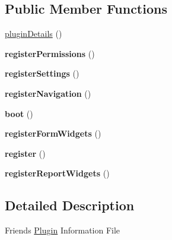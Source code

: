\subsection*{Public Member Functions}
\begin{DoxyCompactItemize}
\item 
\hyperlink{classDMA_1_1Friends_1_1Plugin_abcae4983c18bdb7b266c6aaa7a081d68}{plugin\-Details} ()
\item 
\hypertarget{classDMA_1_1Friends_1_1Plugin_a1f5f007ec6f0f3f16516cf1a2e19d296}{{\bfseries register\-Permissions} ()}\label{classDMA_1_1Friends_1_1Plugin_a1f5f007ec6f0f3f16516cf1a2e19d296}

\item 
\hypertarget{classDMA_1_1Friends_1_1Plugin_ad494274bdd3480e4623b5fec196352b3}{{\bfseries register\-Settings} ()}\label{classDMA_1_1Friends_1_1Plugin_ad494274bdd3480e4623b5fec196352b3}

\item 
\hypertarget{classDMA_1_1Friends_1_1Plugin_aaca6d71040b99d2151b2760c93f3e61c}{{\bfseries register\-Navigation} ()}\label{classDMA_1_1Friends_1_1Plugin_aaca6d71040b99d2151b2760c93f3e61c}

\item 
\hypertarget{classDMA_1_1Friends_1_1Plugin_a8ff526c557ed7081a1f4c04194994305}{{\bfseries boot} ()}\label{classDMA_1_1Friends_1_1Plugin_a8ff526c557ed7081a1f4c04194994305}

\item 
\hypertarget{classDMA_1_1Friends_1_1Plugin_a900bf22951ffe9e109d1c14afdd261d5}{{\bfseries register\-Form\-Widgets} ()}\label{classDMA_1_1Friends_1_1Plugin_a900bf22951ffe9e109d1c14afdd261d5}

\item 
\hypertarget{classDMA_1_1Friends_1_1Plugin_adfd39323d7e2724cdacdb41d590b32e2}{{\bfseries register} ()}\label{classDMA_1_1Friends_1_1Plugin_adfd39323d7e2724cdacdb41d590b32e2}

\item 
\hypertarget{classDMA_1_1Friends_1_1Plugin_af4c0877dc0c5067f527fa414bc70de57}{{\bfseries register\-Report\-Widgets} ()}\label{classDMA_1_1Friends_1_1Plugin_af4c0877dc0c5067f527fa414bc70de57}

\end{DoxyCompactItemize}


\subsection{Detailed Description}
Friends \hyperlink{classDMA_1_1Friends_1_1Plugin}{Plugin} Information File 

